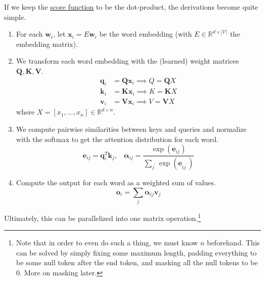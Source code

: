     \begin{definition}
      \label{def:standard-scaled-dot-product-attention}
      If we keep the \hyperref[def:score-function]{score function} to be the dot-product, the derivations become quite simple. 
      \begin{enumerate}
        \item For each $\mathbf{w}_i$, let $\mathbf{x}_i = E \mathbf{w}_i$ be the word embedding (with $E \in \mathbb{R}^{d \times |\mathcal{V}|}$ the embedding matrix). 

        \item We transform each word embedding with the (learned) weight matrices $\mathbf{Q}, \mathbf{K}, \mathbf{V}$. 
        \begin{align*} 
          \mathbf{q}_i & = \mathbf{Q} \mathbf{x}_i \implies Q = \mathbf{Q} X \\
          \mathbf{k}_i & = \mathbf{K} \mathbf{x}_i \implies K = \mathbf{K} X \\
          \mathbf{v}_i & = \mathbf{V} \mathbf{x}_i \implies V = \mathbf{V} X 
        \end{align*}
        where $X = [x_1, \ldots, x_n] \in \mathbb{R}^{d \times n}$.  

        \item We compute pairwise similarities between keys and queries and normalize with the softmax to get the attention distribution for each word. 
          \begin{equation}
            \mathbf{e}_{ij} = \mathbf{q}_i^T \mathbf{k}_j , \;\;\; \boldsymbol{\alpha}_{ij} = \frac{\exp(\mathbf{e}_{ij})}{\sum_{j^\prime} \exp(\mathbf{e}_{i j^\prime})}
          \end{equation}

        \item Compute the output for each word as a weighted sum of values. 
          \begin{equation}
            \mathbf{o}_i = \sum_j \boldsymbol{\alpha}_{ij} \mathbf{v}_j 
          \end{equation}
      \end{enumerate}

      Ultimately, this can be parallelized into one matrix operation.\footnote{Note that in order to even do such a thing, we must know $n$ beforehand. This can be solved by simply fixing some maximum length, padding everything to be some null token after the end token, and masking all the null tokens to be $0$. More on masking later. } 


\end{definition}
